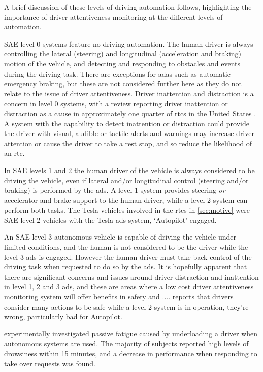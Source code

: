 \documentclass[11pt, parskip=half*,twoside=false]{scrbook}
\begin{document}
A brief discussion of these levels of driving automation follows, highlighting the importance of driver attentiveness monitoring at the different levels of automation. 

SAE level 0 systems feature no driving automation. The human driver is always controlling the lateral (steering) and longitudinal (acceleration and braking) motion of the vehicle, and detecting and responding to obstacles and events during the driving task. There are exceptions for \gls{adas} such as automatic emergency braking, but these are not considered further here as they do not relate to the issue of driver attentiveness. Driver inattention and distraction is a concern in level 0 systems, with a review reporting driver inattention or distraction as a cause in approximately one quarter of \glspl{rtc} in the United States \citep{youngDriverDistraction2007}. A system with the capability to detect inattention or distraction could provide the driver with visual, audible or tactile alerts and warnings may increase driver attention or cause the driver to take a rest stop, and so reduce the likelihood of an \gls{rtc}.

In SAE levels 1 and 2 the human driver of the vehicle is always considered to be driving the vehicle, even if lateral and/or longitudinal control (steering and/or braking) is performed by the \gls{ads}. A level 1 system provides steering \emph{or} accelerator and brake support to the human driver, while a level 2 system can perform both tasks. The Tesla vehicles involved in the \glspl{rtc} in \cref{sec:motive} were SAE level 2 vehicles with the Tesla \gls{ads} system, `Autopilot' engaged. 

An SAE level 3 autonomous vehicle is capable of driving the vehicle under limited conditions, and the human is not considered to be the driver while the level 3 \gls{ads} is engaged. However the human driver must take back control of the driving task when requested to do so by the \gls{ads}. It is hopefully apparent that there are significant concerns and issues around driver distraction and inattention in level 1, 2 and 3 \gls{ads}, and these are areas where a low cost driver attentiveness monitoring system will offer benefits in safety and ....  \citet{teohWhatNameDrivers2020} reports that drivers consider many actions to be safe while a level 2 system is in operation, they're wrong, particularly bad for Autopilot.

\citet{goncalvesDrowsinessConditionalAutomation2016} experimentally investigated passive fatigue caused by underloading a driver when autonomous systems are used. The majority of subjects reported high levels of drowsiness within 15 minutes, and a decrease in performance when responding to take over requests was found.
\end{document}
